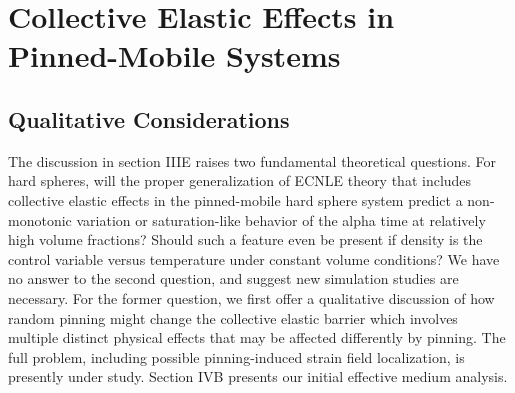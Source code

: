 \documentclass[twocolumn,showpacs,preprintnumbers,amsmath,amssymb,unsortedaddress,
]{revtex4-1}
\begin{document}
\section{Collective Elastic Effects in Pinned-Mobile Systems}
\subsection{Qualitative Considerations}
The discussion in section IIIE raises two fundamental theoretical questions. For hard spheres, will the proper generalization of ECNLE theory that includes collective elastic effects in the pinned-mobile hard sphere system predict a non-monotonic variation or saturation-like behavior of the alpha time at relatively high volume fractions?  Should such a feature even be present if density is the control variable versus temperature under constant volume conditions? We have no answer to the second question, and suggest new simulation studies are necessary. For the former question, we first offer a qualitative discussion of how random pinning might change the collective elastic barrier which involves multiple distinct physical effects that may be affected differently by pinning. The full problem, including possible pinning-induced strain field localization, is presently under study. Section IVB presents our initial effective medium analysis.
\end{document}
